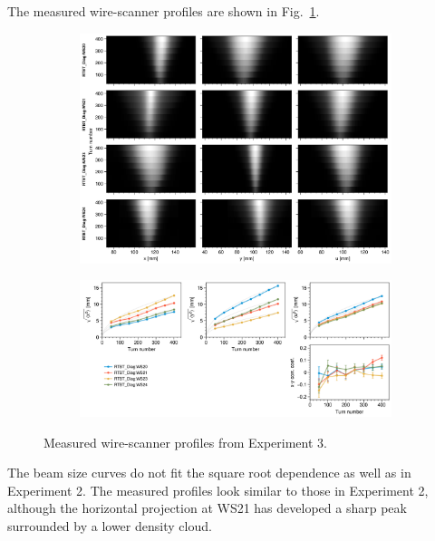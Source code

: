 The measured wire-scanner profiles are shown in Fig.~\ref{fig:exp3_wsmeas}.
%
\begin{figure}[!p]
    \centering
    \begin{subfigure}{\textwidth}
        \includegraphics[width=\textwidth]{Images/chapter5/exp3/waterfall.png}
    \end{subfigure}
    \vfill
    \vspace*{1.25cm}
    \vfill
    \begin{subfigure}{\textwidth}
        \includegraphics[width=\textwidth]{Images/chapter5/exp3/rms.png}
    \end{subfigure}
    \caption{Measured wire-scanner profiles from Experiment 3.}
    \label{fig:exp3_wsmeas}
\end{figure}
%
The beam size curves do not fit the square root dependence as well as in Experiment 2. The measured profiles look similar to those in Experiment 2, although the horizontal projection at WS21 has developed a sharp peak surrounded by a lower density cloud. 

